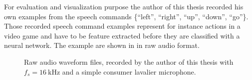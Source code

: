 For evaluation and visualization purpose the author of this thesis recorded his own examples from the speech commands \{\enquote{left}, \enquote{right}, \enquote{up}, \enquote{down}, \enquote{go}\}.
Those recorded speech command examples represent for instance actions in a video game and have to be feature extracted before they are classified with a neural network.
The example are shown in  in raw audio format.
\begin{figure}[!ht]
  \centering
  \caption{Raw audio waveform files, recorded by the author of this thesis with $f_s=\SI{16}{\kilo\hertz}$ and a simple consumer lavalier microphone.}
  \label{fig:raw_audio_my}
\end{figure}
\FloatBarrier
